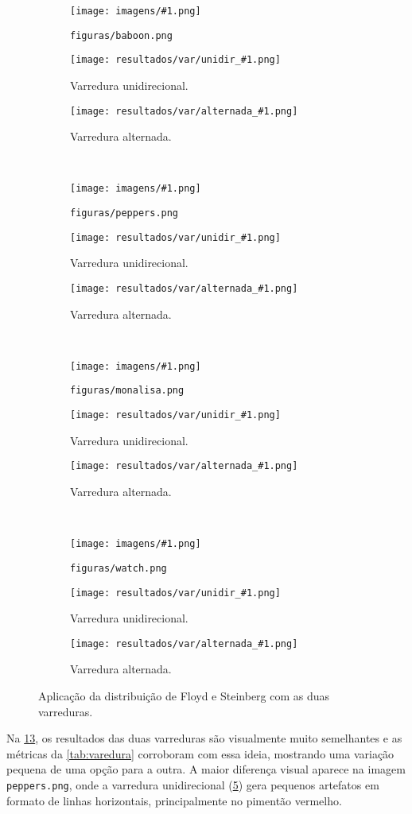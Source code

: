 \newcommand{\imagem}[1]{
    \centering
    \begin{subfigure}{0.32\textwidth}
        \centering
        \texttt{[image: imagens/\#1.png]}
        \caption{\texttt{figuras/#1.png}}
        \label{fig:#1:orig}
    \end{subfigure}%
    \begin{subfigure}{0.32\textwidth}
        \centering
        \texttt{[image: resultados/var/unidir\_\#1.png]}
        \caption{Varredura unidirecional.}
        \label{fig:#1:unidir}
    \end{subfigure}%
    \begin{subfigure}{0.32\textwidth}
        \centering
        \texttt{[image: resultados/var/alternada\_\#1.png]}
        \caption{Varredura alternada.}
        \label{fig:#1:alt}
    \end{subfigure}
}

\begin{figure}[H]
    \centering
    \imagem{baboon}\\[8pt]
    \imagem{peppers}\\[8pt]
    \imagem{monalisa}\\[8pt]
    \imagem{watch}

    \caption{Aplicação da distribuição de Floyd e Steinberg com as duas varreduras.}
    \label{fig:resultado:varredura}
\end{figure}

Na \cref{fig:resultado:varredura}, os resultados das duas varreduras são visualmente muito semelhantes e as métricas da \cref{tab:varedura} corroboram com essa ideia, mostrando uma variação pequena de uma opção para a outra. A maior diferença visual aparece na imagem \texttt{peppers.png}, onde a varredura unidirecional (\ref{fig:peppers:unidir}) gera pequenos artefatos em formato de linhas horizontais, principalmente no pimentão vermelho.

